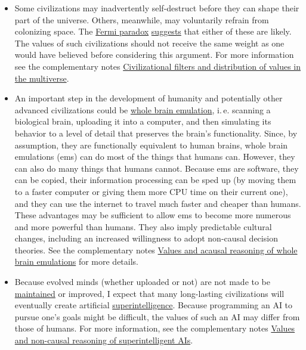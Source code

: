 \begin{itemize}
\item
  Some civilizations may inadvertently self-destruct before they can
  shape their part of the universe. Others, meanwhile, may voluntarily
  refrain from colonizing space. The
  \href{https://en.wikipedia.org/wiki/Fermi_paradox}{Fermi
  paradox}
  \href{https://www.youtube.com/watch?v=aspMV6ERqpo}{suggests}
  that either of these are likely. The values of such civilizations
  should not receive the same weight as one would have believed before
  considering this argument. For more information see the
  complementary notes \href{https://foundational-research.org/files/Civilizational-filters-and-the-Fermi-paradox.pdf}{Civilizational filters and distribution of values in the multiverse}. 
\item
  An important step in the development of humanity and potentially other
  advanced civilizations could be
  \href{https://en.wikipedia.org/wiki/Mind_uploading}{whole brain
  emulation}, i.\,e. scanning a biological brain, uploading it into a
  computer, and then simulating its behavior to a level of detail that
  preserves the brain's functionality. Since, by assumption, they are
  functionally equivalent to human brains, whole brain emulations (ems)
  can do most of the things that humans can. However, they can also do
  many things that humans cannot. Because ems are software, they can be
  copied, their information processing can be sped up (by moving them to
  a faster computer or giving them more CPU time on their current one),
  and they can use the internet to travel much faster and cheaper than
  humans. These advantages may be sufficient to allow ems to become more
  numerous and more powerful than humans. They also imply predictable
  cultural changes, including an increased willingness to adopt
  non-causal decision theories. See the
  complementary notes \href{https://foundational-research.org/files/Whole-brain-emulation.pdf}{Values and acausal reasoning of whole brain emulations} for
  more details. 
\item
  Because evolved minds (whether uploaded or not) are not made to be
  \href{https://en.wikipedia.org/wiki/Software_maintenance}{maintained}
  or improved, I expect that many long-lasting civilizations will
  eventually create artificial
  \href{https://en.wikipedia.org/wiki/Superintelligence}{superintelligence}.
  Because programming an AI to pursue one's goals might be difficult,
  the values of such an AI may differ from those of humans. For more
  information, see the complementary
  notes \href{https://foundational-research.org/files/Superintelligent-AIs.pdf}{Values and non-causal reasoning of superintelligent AIs}.
\end{itemize}

